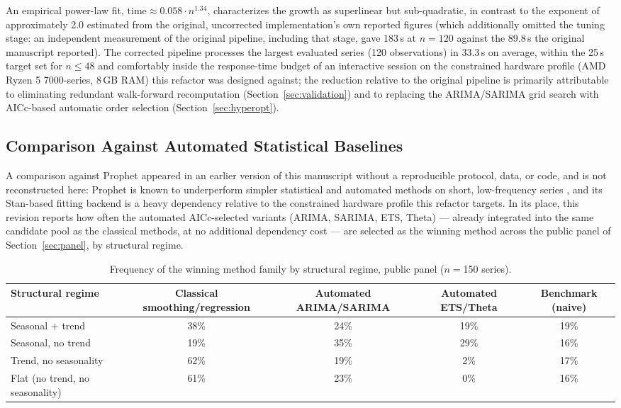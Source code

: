 \documentclass[forecasting,article,submit,pdftex,moreauthors]{Definitions/mdpi}
\begin{document}
An empirical power-law fit, $\text{time} \approx 0.058 \cdot n^{1.34}$, characterizes the growth as superlinear but sub-quadratic, in contrast to the exponent of approximately 2.0 estimated from the original, uncorrected implementation's own reported figures (which additionally omitted the tuning stage: an independent measurement of the original pipeline, including that stage, gave 183\,s at $n=120$ against the 89.8\,s the original manuscript reported). The corrected pipeline processes the largest evaluated series (120 observations) in 33.3\,s on average, within the 25\,s target set for $n\leq48$ and comfortably inside the response-time budget of an interactive session on the constrained hardware profile (AMD Ryzen 5 7000-series, 8\,GB RAM) this refactor was designed against; the reduction relative to the original pipeline is primarily attributable to eliminating redundant walk-forward recomputation (Section~\ref{sec:validation}) and to replacing the ARIMA/SARIMA grid search with AICc-based automatic order selection (Section~\ref{sec:hyperopt}).

\subsection{Comparison Against Automated Statistical Baselines}
\label{sec:autobaselines}

A comparison against Prophet appeared in an earlier version of this manuscript without a reproducible protocol, data, or code, and is not reconstructed here: Prophet is known to underperform simpler statistical and automated methods on short, low-frequency series \cite{makridakis2020}, and its Stan-based fitting backend is a heavy dependency relative to the constrained hardware profile this refactor targets. In its place, this revision reports how often the automated AICc-selected variants (ARIMA, SARIMA, ETS, Theta) --- already integrated into the same candidate pool as the classical methods, at no additional dependency cost --- are selected as the winning method across the public panel of Section~\ref{sec:panel}, by structural regime.

\begin{table}[H]
\caption{Frequency of the winning method family by structural regime, public panel ($n=$150 series).\label{tab:ganadores}}
\centering
\begin{tabularx}{\textwidth}{Xcccc}
\toprule
\textbf{Structural regime} & \textbf{Classical smoothing/regression} & \textbf{Automated ARIMA/SARIMA} & \textbf{Automated ETS/Theta} & \textbf{Benchmark (naive)} \\
\midrule
Seasonal + trend & 38\% & 24\% & 19\% & 19\% \\
Seasonal, no trend & 19\% & 35\% & 29\% & 16\% \\
Trend, no seasonality & 62\% & 19\% & 2\% & 17\% \\
Flat (no trend, no seasonality) & 61\% & 23\% & 0\% & 16\% \\
\bottomrule
\end{tabularx}
\end{table}
\end{document}
